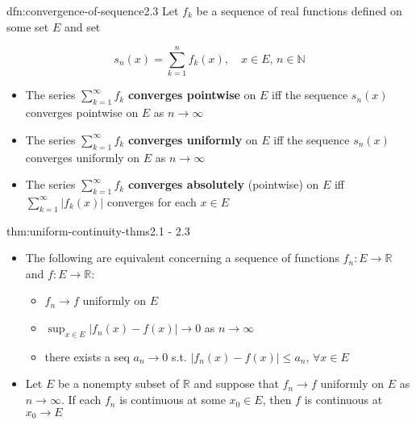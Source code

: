 \documentclass[landscape, 8pt]{extarticle}
\begin{document}
\begin{multicols}{3}
\vspace{-5pt}
\begin{dfn}{dfn:convergence-of-sequence}{2.3}
	Let $f_{k}$ be a sequence of real functions defined on some set $E$ and set

	\vspace{-5pt}
	\[s_{n}(x)=\sum_{k=1}^{n} f_{k}(x),\quad x\in E,\,n\in \mathbb{N}\]
	\begin{itemize}
		\setlength\itemsep{0em}
		\item The series $\sum_{k=1}^{\infty} f_{k}$ \textbf{converges pointwise} on $E$ iff the sequence $s_{n}(x)$ converges pointwise on $E$ as $n\to\infty$

		\item The series $\sum_{k=1}^{\infty} f_{k}$ \textbf{converges uniformly} on $E$ iff the sequence $s_{n}(x)$ converges uniformly on $E$ as $n\to\infty$

		\item The series $\sum_{k=1}^{\infty} f_{k}$ \textbf{converges absolutely} (pointwise) on $E$ iff $\sum_{k=1}^{\infty} \lvert f_{k}(x) \rvert$ converges for each $x\in E$

	\end{itemize}
\end{dfn}


\begin{thm}{thm:uniform-continuity-thms}{2.1 - 2.3}
	\begin{itemize}
	    \setlength\itemsep{0em}
	    \item The following are equivalent concerning a sequence of functions $f_{n}:E\to \mathbb{R}$ and $f: E\to \mathbb{R}$:

			\begin{itemize}[leftmargin=*]
				\setlength\itemsep{0em}
				\item $f_{n}\to f$ uniformly on $E$

				\item $\displaystyle\sup_{x\in E}\lvert f_{n}(x)-f(x) \rvert\to 0$ as $n\to\infty$

				\item there exists a seq $a_{n}\to 0$ s.t. $\lvert f_{n}(x)-f(x) \rvert\le a_{n},\, \forall x\in E$

			\end{itemize}
			
		\item[\textbf{2.1}:] Let $E$ be a nonempty subset of $\mathbb{R}$ and suppose that $f_{n}\to f$ uniformly on $E$ as $n\to\infty$. If each $f_{n}$ is continuous at some $x_{0}\in E$, then $f$ is continuous at $x_{0}\to E$
		

\end{itemize}
\end{thm}
\end{multicols}
\end{document}
